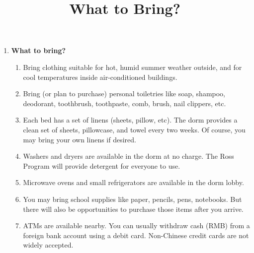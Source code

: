 \documentclass[11pt]{rossasia}
\title{What to Bring?}
\begin{document}
\maketitle
 \begin{enumerate}[label=(\arabic*),itemsep=2em,topsep=-1em]
\item \textbf{What to bring?}
 \begin{enumerate}[label=(\alph*),itemsep=0.5em,topsep=0em]
 \item Bring clothing suitable for hot, humid summer weather outside, and for 
   cool \linebreak temperatures inside air-conditioned buildings.  
\item Bring (or plan to
   purchase) personal toiletries like soap, shampoo, deodorant,
   toothbrush, toothpaste, comb, brush, nail clippers, etc.
 \item  Each bed has a set of linens (sheets, pillow, etc).
   The dorm provides a clean set of sheets, pillowcase, and towel 
   every two weeks.  Of course, you may bring your own linens
   if desired.
 \item Washers and dryers are available in the dorm at no charge.  The
   Ross Program will provide detergent for everyone to use.
 \item Microwave ovens and small refrigerators are available in
   the dorm lobby.  
\item You may bring school supplies like paper, pencils, pens,
   notebooks.  But there will also be opportunities to purchase those
   items after you arrive.
\item   ATMs are available nearby. 
    You can usually withdraw cash (RMB) from a\linebreak 
     foreign bank account using a debit card.
    Non-Chinese credit cards are not widely accepted.
\end{enumerate}


\end{enumerate}
\end{document}
